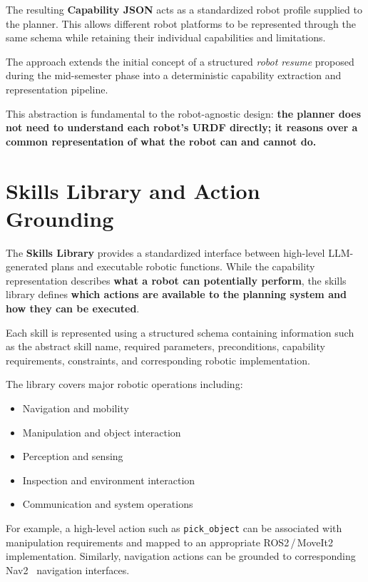 \documentclass[12pt,a4paper]{article}
\begin{document}
The resulting \textbf{Capability JSON} acts as a standardized robot profile supplied to the planner.
This allows different robot platforms to be represented through the same schema while retaining their individual capabilities and limitations.

The approach extends the initial concept of a structured \textit{robot resume} proposed during the mid-semester phase into a deterministic capability extraction and representation pipeline.

This abstraction is fundamental to the robot-agnostic design:
\textbf{the planner does not need to understand each robot's URDF directly; it reasons over a common representation of what the robot can and cannot do.}

\section{Skills Library and Action Grounding}

The \textbf{Skills Library} provides a standardized interface between high-level LLM-generated plans and executable robotic functions.
While the capability representation describes \textbf{what a robot can potentially perform}, the skills library defines \textbf{which actions are available to the planning system and how they can be executed}.

Each skill is represented using a structured schema containing information such as the abstract skill name, required parameters, preconditions, capability requirements, constraints, and corresponding robotic implementation.

The library covers major robotic operations including:

\begin{itemize}
  \item Navigation and mobility
  \item Manipulation and object interaction
  \item Perception and sensing
  \item Inspection and environment interaction
  \item Communication and system operations
\end{itemize}

For example, a high-level action such as \texttt{pick\_object} can be associated with manipulation requirements and mapped to an appropriate ROS2\,/\,MoveIt2~\cite{moveit2} implementation.
Similarly, navigation actions can be grounded to corresponding Nav2~\cite{nav2} navigation interfaces.
\end{document}
